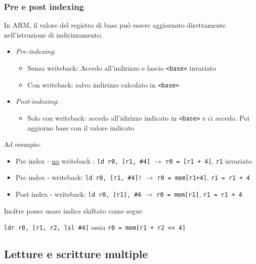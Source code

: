 \subsubsection*{Pre e post indexing}
In ARM, il valore del registro di base può essere aggiornato direttamente nell'istruzione di indirizzamento.
\begin{itemize}
	\item \textit{Pre-indexing}:
	      \begin{itemize}
		      \item Senza writeback: Accedo all'indirizzo e lascio \verb|<base>| invariato
		      \item  Con writeback: salvo indirizzo calcolato in \verb|<base>|
	      \end{itemize}
	\item \textit{Post-indexing}:
	      \begin{itemize}
		      \item Solo con writeback: accedo all'idirizzo indicato in \verb|<base>| e ci accedo. Poi aggiorno base con il valore indicato
	      \end{itemize}
\end{itemize}
Ad esempio:
\begin{itemize}
	\item Pre index - \underline{no} writeback : \verb|ld r0, [r1, #4]| $ \rightarrow  $ \verb|r0 = [r1 + 4]|, \verb|r1| invariato
	\item Pre index - writeback: \verb|ld r0, [r1, #4]!| $ \rightarrow  $ \verb|r0 = mem[r1+4]|, \verb|r1 = r1 + 4|
	\item Post index - writeback: \verb|ld r0, [r1], #4| $ \rightarrow  $ \verb|r0 = mem[r1]|, \verb|r1 = r1 + 4|
\end{itemize}
Inoltre posso usare indice shiftato come segue
\begin{center}
	\verb|ldr r0, [r1, r2, lsl #4]| ossia \verb|r0 = mem[r1 + r2 << 4]|
\end{center}
\subsection{Letture e scritture multiple}

